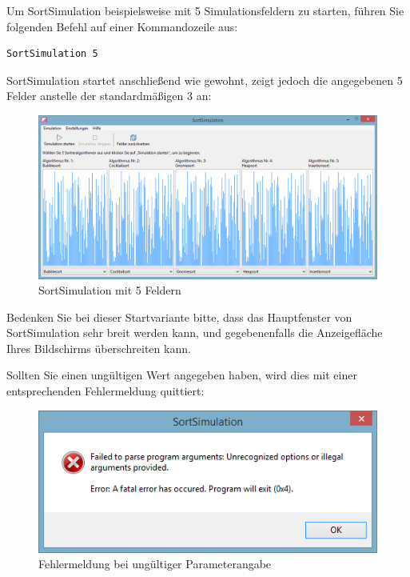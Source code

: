 \documentclass[german]{pfBook}
\begin{document}
	Um SortSimulation beispielsweise mit 5 Simulationsfeldern zu starten, führen Sie folgenden Befehl auf einer Kommandozeile aus:
	
	\begin{lstlisting}[style=shell]
SortSimulation 5
	\end{lstlisting}
	
	SortSimulation startet anschließend wie gewohnt, zeigt jedoch die angegebenen 5 Felder anstelle der standardmäßigen 3 an:
	
	\begin{figure}[h]
		\centering
		\includegraphics[scale=0.6]{images/image2.png}
		\caption{SortSimulation mit 5 Feldern}
		\label{fig:5fields}
	\end{figure}
	
	Bedenken Sie bei dieser Startvariante bitte, dass das Hauptfenster von SortSimulation sehr breit werden kann, und gegebenenfalls die Anzeigefläche Ihres Bildschirms überschreiten kann.
	
	Sollten Sie einen ungültigen Wert angegeben haben, wird dies mit einer entsprechenden Fehlermeldung quittiert:
	
	\begin{figure}[h]
		\centering
		\includegraphics[scale=0.6]{images/image3.png}
		\caption{Fehlermeldung bei ungültiger Parameterangabe}
		\label{fig:parameterserror}
	\end{figure}
	
\end{document}
